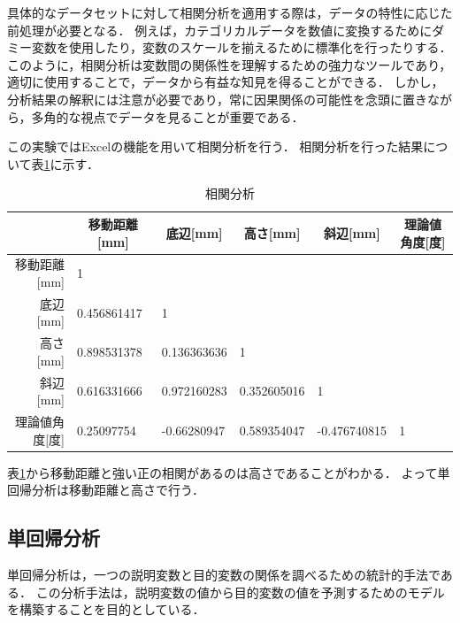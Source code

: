 \documentclass[titlepage,a4paper]{jsarticle}
\begin{document}
具体的なデータセットに対して相関分析を適用する際は，データの特性に応じた前処理が必要となる．
例えば，カテゴリカルデータを数値に変換するためにダミー変数を使用したり，変数のスケールを揃えるために標準化を行ったりする．
このように，相関分析は変数間の関係性を理解するための強力なツールであり，適切に使用することで，データから有益な知見を得ることができる．
しかし，分析結果の解釈には注意が必要であり，常に因果関係の可能性を念頭に置きながら，多角的な視点でデータを見ることが重要である．

この実験ではExcelの機能を用いて相関分析を行う．
相関分析を行った結果について表\ref{相関分析}に示す．
\begin{table}[H]
  \caption{相関分析}
  \label{相関分析}
  \begin{tabular}{r|lllll}
                 & \multicolumn{1}{c}{移動距離{[}mm{]}} & \multicolumn{1}{c}{底辺{[}mm{]}} & \multicolumn{1}{c}{高さ{[}mm{]}} & \multicolumn{1}{c}{斜辺{[}mm{]}} & \multicolumn{1}{c}{理論値角度{[}度{]}} \\\hline\hline
    移動距離{[}mm{]} & 1                                &                                &                                &                                &                                  \\
    底辺{[}mm{]}   & 0.456861417                      & 1                              &                                &                                &                                  \\
    高さ{[}mm{]}   & 0.898531378                      & 0.136363636                    & 1                              &                                &                                  \\
    斜辺{[}mm{]}   & 0.616331666                      & 0.972160283                    & 0.352605016                    & 1                              &                                  \\
    理論値角度{[}度{]} & 0.25097754                       & -0.66280947                    & 0.589354047                    & -0.476740815                   & 1                                \\\hline
  \end{tabular}
\end{table}
表\ref{相関分析}から移動距離と強い正の相関があるのは高さであることがわかる．
よって単回帰分析は移動距離と高さで行う．


\subsection{単回帰分析}
単回帰分析は，一つの説明変数と目的変数の関係を調べるための統計的手法である．
この分析手法は，説明変数の値から目的変数の値を予測するためのモデルを構築することを目的としている．
\end{document}
